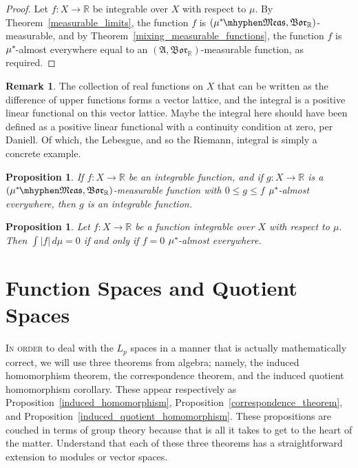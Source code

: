 \documentclass[
twoside=true,
paper=letter,
fontsize=11pt,
pagesize=auto,
leqno,
openany,
headsepline,
overfullrule,
]{scrbook}
\theoremstyle{plain}
\theoremstyle{plain}
\newtheorem{prop}[thm]{Proposition}
\theoremstyle{definition}
\newtheorem{rmk}[thm]{Remark}
\theoremstyle{bfnoteitalic}
\theoremstyle{bfnoteroman}
\newcommand{\sigalg}[1]{\mathfrak{#1}}
\newcommand{\borel}{\mathfrak{Bor}}
\newcommand{\abs}[1]{\left\vert#1\right\vert}
\newcommand{\R}{\mathbb{R}}
\newcommand{\sigmaalgebra}{\sigalg{A}}
\newcommand{\measurable}[1]{{#1}\mhyphen\mathfrak{Meas}}
\newcommand{\kernast}{\ast\kern-1pt}
\newcommand{\funcf}{f}
\newcommand{\function}{f}
\newcommand{\functionii}{g}
\newcommand{\measurespace}{X}
\newcommand{\measure}{\mu}
\begin{document}
\begin{proof}
Let
$f:\measurespace\to\R$ be integrable over $\measurespace$ with respect to $\measure$.
By Theorem~\ref{measurable_limits},  the function $\funcf$ is
$(\measurable{\measure^\kernast}, \borel_\R)$\hyp{}measurable, and
by Theorem~\ref{mixing_measurable_functions}, the function $\funcf$ is $\measure^\kernast$\hyp{}almost everywhere equal to an $(\sigmaalgebra,\borel_\R)$\hyp{}measurable function, as required.
\end{proof}


\begin{rmk}
The collection of real functions on $\measurespace$ that can be written as the difference of upper functions forms a vector lattice, and the integral is a positive linear functional on this vector lattice. Maybe the integral here should have been defined as a positive linear functional with a continuity condition at zero, per Daniell. Of which, the Lebesgue, and so the Riemann, integral is simply a concrete example.
\end{rmk}



\begin{prop}\label{dominated_by_integrable}
If $\function:\measurespace \to \R$ be an integrable function,
and if $\functionii:\measurespace \to \R$ is a $(\measurable{\measure^\kernast},\borel_\R)$\hyp{}measurable function with
$0\leq \functionii \leq \function$ $\measure^\kernast$-almost everywhere, then $\functionii$ is an integrable function.
\end{prop}



\begin{prop}\label{integral_absolute_zero}
Let $f:\measurespace\to\R$ be a function integrable over $\measurespace$ with respect to $\measure$.  
Then $\int \abs{f} \,d\measure = 0$ if and only if $f=0$ $\measure^\kernast$-almost everywhere.
\end{prop}



\chapter{Function Spaces and Quotient Spaces}
\lettrine{I}{n order} to deal with the $L_p$ spaces in a manner that is actually mathematically correct, 
we will use three theorems from algebra; namely, 
the induced homomorphism theorem, the correspondence theorem, and the induced quotient homomorphism corollary. These appear respectively as Proposition~\ref{induced_homomorphism}, Proposition~\ref{correspondence_theorem}, and Proposition~\ref{induced_quotient_homomorphism}. These propositions are couched in terms of group theory because that is all it takes to get to the heart of the matter. Understand that each of these three theorems has a straightforward extension to modules or vector spaces.
\end{document}
